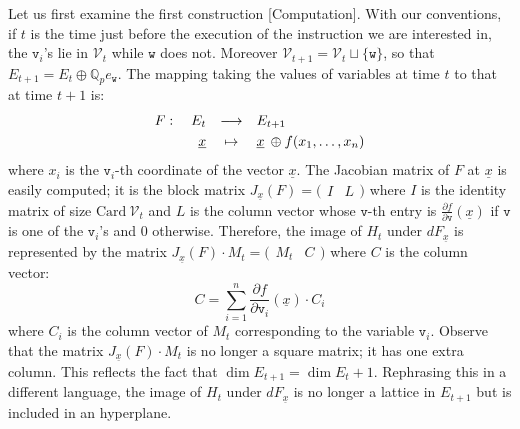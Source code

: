 \documentclass[sigconf]{acmart}
\newcommand{\Q}{\mathbb Q}
\newcommand{\Qp}{\Q_p}
\newcommand{\calV}{\mathcal{V}}
\newcommand{\ttv}{\texttt{v}\xspace}
\newcommand{\ttw}{\texttt{w}\xspace}
\theoremstyle{definition}
\begin{document}
Let us first examine the first construction [Computation].
With our conventions, if $t$ is the time just before the execution of 
the instruction we are interested in, the $\ttv_i$'s lie in $\calV_t$ 
while $\ttw$ does not. Moreover $\calV_{t+1} = \calV_t \sqcup \{\ttw\}$, 
so that $E_{t+1} = E_t \oplus \Qp e_\ttw$.
The mapping taking the values of variables at time $t$ to that at 
time $t{+}1$ is:
$$\begin{array}{rcl}
F: \quad E_t & \longrightarrow & E_{t+1} \smallskip \\
\underline x & \mapsto & \underline x \:\oplus f(x_1, \ldots, x_n)
\end{array}$$
where $x_i$ is the $\ttv_i$-th coordinate of the vector $\underline x$.
The Jacobian matrix of $F$ at $\underline x$ is easily computed; it 
is the block matrix $J_{\underline x}(F) = \big( \begin{matrix} I & L
\end{matrix} \big)$ where $I$ is the identity matrix of size $\text{Card}
\:\calV_t$ and $L$ is the column vector whose $\ttv$-th entry is
$\frac{\partial f}{\partial \ttv} (\underline x)$ if $\ttv$ is one of 
the $\ttv_i$'s and $0$ otherwise.
Therefore, the image of $H_t$ under $dF_{\underline x}$ is represented 
by the matrix $J_{\underline x}(F) \cdot M_t = \big( \begin{matrix} M_t & C
\end{matrix} \big)$ where $C$ is the column vector:
\begin{equation}
\label{eq:defC}
C = \sum_{i=1}^n \frac{\partial f}{\partial{\ttv_i}} (\underline x)
\cdot C_i
\end{equation}
where $C_i$ is the column vector of $M_t$ corresponding to the
variable $\ttv_i$.
Observe that the matrix $J_{\underline x}(F) \cdot M_t$ is no longer a 
square matrix; it has one extra column. This reflects the fact that 
$\dim E_{t+1} = \dim E_t + 1$. Rephrasing this in a different language, 
the image of $H_t$ under $dF_{\underline x}$ is no longer a lattice in 
$E_{t+1}$ but is included in an hyperplane.
\end{document}
